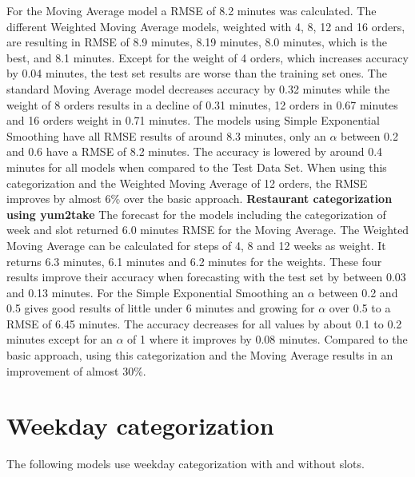For the Moving Average model a RMSE of 8.2 minutes was calculated. The different Weighted Moving Average models, weighted with 4, 8, 12 and 16 orders, are resulting in RMSE of 8.9 minutes, 8.19 minutes, 8.0 minutes, which is the best, and 8.1 minutes. Except for the weight of 4 orders, which increases accuracy by 0.04 minutes, the test set results are worse than the training set ones. The standard Moving Average model decreases accuracy by 0.32 minutes while the weight of 8 orders results in a decline of 0.31 minutes, 12 orders in 0.67 minutes and 16 orders weight in 0.71 minutes. The models using Simple Exponential Smoothing have all RMSE results of around 8.3 minutes, only an $\alpha$ between 0.2 and 0.6 have a RMSE of 8.2 minutes. The accuracy is lowered by around 0.4 minutes for all models when compared to the Test Data Set.\newline
When using this categorization and the Weighted Moving Average of 12 orders, the RMSE improves by almost 6\% over the basic approach.
\newline\newline\textbf{Restaurant categorization using yum2take}\newline
The forecast for the models including the categorization of week and slot returned 6.0 minutes RMSE for the Moving Average. The Weighted Moving Average can be calculated for steps of 4, 8 and 12 weeks as weight. It returns 6.3 minutes, 6.1 minutes and 6.2 minutes for the weights. These four results improve their accuracy when forecasting with the test set by between 0.03 and 0.13 minutes. For the Simple Exponential Smoothing an $\alpha$ between 0.2 and 0.5 gives good results of little under 6 minutes and growing for $\alpha$ over 0.5 to a RMSE of 6.45 minutes. The accuracy decreases for all values by about 0.1 to 0.2 minutes except for an $\alpha$ of 1 where it improves by 0.08 minutes.\newline
Compared to the basic approach, using this categorization and the Moving Average results in an improvement of almost 30\%.
\section{Weekday categorization}\label{section:Weekday categorization}
The following models use weekday categorization with and without slots.
